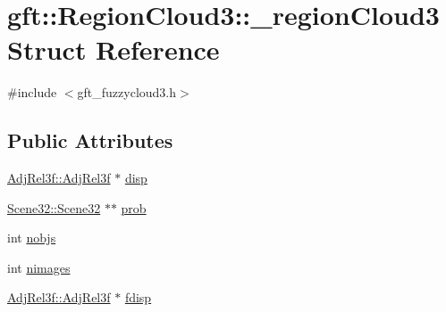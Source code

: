\hypertarget{structgft_1_1RegionCloud3_1_1__regionCloud3}{\section{gft\-:\-:Region\-Cloud3\-:\-:\-\_\-region\-Cloud3 Struct Reference}
\label{structgft_1_1RegionCloud3_1_1__regionCloud3}
}


{\ttfamily \#include $<$gft\-\_\-fuzzycloud3.\-h$>$}

\subsection*{Public Attributes}
\begin{DoxyCompactItemize}
\item 
\hyperlink{namespacegft_1_1AdjRel3f_a83ef20d6a560143af34ad546deafbe5f}{Adj\-Rel3f\-::\-Adj\-Rel3f} $\ast$ \hyperlink{structgft_1_1RegionCloud3_1_1__regionCloud3_a8c55031707f6f59498992f8c1ecd4e2c}{disp}
\item 
\hyperlink{namespacegft_1_1Scene32_ae492ac529c9149889605a7bebd647c46}{Scene32\-::\-Scene32} $\ast$$\ast$ \hyperlink{structgft_1_1RegionCloud3_1_1__regionCloud3_a80d4c38584c9d6d720c721ebd4d13b06}{prob}
\item 
int \hyperlink{structgft_1_1RegionCloud3_1_1__regionCloud3_a468bf8f45dcc2dad9a1e744027f161d1}{nobjs}
\item 
int \hyperlink{structgft_1_1RegionCloud3_1_1__regionCloud3_ab85f7c4725ed3a18976e5fe022f087bb}{nimages}
\item 
\hyperlink{namespacegft_1_1AdjRel3f_a83ef20d6a560143af34ad546deafbe5f}{Adj\-Rel3f\-::\-Adj\-Rel3f} $\ast$ \hyperlink{structgft_1_1RegionCloud3_1_1__regionCloud3_a3f63f3c56e6794f68d38e427bbabb8e4}{fdisp}
\end{DoxyCompactItemize}


